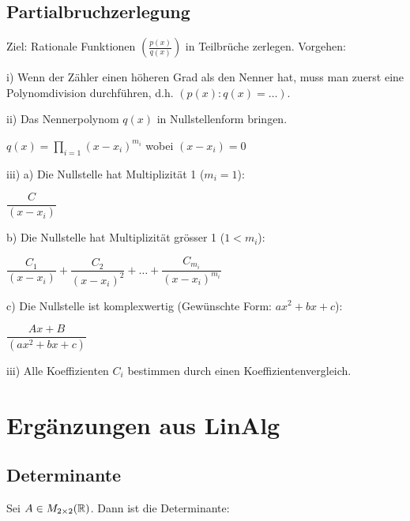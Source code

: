 \begin{multicols*}{3}
    \subsection{Partialbruchzerlegung}

    Ziel: Rationale Funktionen $\left(\frac{p(x)}{q(x)}\right)$ in Teilbrüche zerlegen. Vorgehen: \medskip

    i) Wenn der Zähler einen höheren Grad als den Nenner hat, muss man zuerst eine Polynomdivision durchführen, d.h. $\left(p(x):q(x) = \dots\right)$. \medskip

    ii) Das Nennerpolynom $q(x)$ in Nullstellenform bringen.

    \begin{center}
        $q(x) = \prod\limits_{i = 1} (x - x_i)^{m_i}$ \qquad wobei $(x - x_i) = 0$
    \end{center}

    iii) a) Die Nullstelle hat Multiplizität 1 ($m_i = 1$):

    \begin{center}
        $\dfrac{C}{(x - x_i)}$
    \end{center}

    b) Die Nullstelle hat Multiplizität grösser 1 ($1 < m_i$):

    \begin{center}
        $\dfrac{C_1}{(x - x_i)} + \dfrac{C_2}{(x - x_i)^2} + \dots + \dfrac{C_{m_i}}{(x - x_i)^{m_i}}$
    \end{center}

    c) Die Nullstelle ist komplexwertig (Gewünschte Form: $ax^2 + b x + c$):

    \begin{center}
        $\dfrac{Ax + B}{(a x^2 + b x + c)}$
    \end{center}

    iii) Alle Koeffizienten $C_i$ bestimmen durch einen Koeffizientenvergleich.
    \vfill\null
    \columnbreak


    \section{Ergänzungen aus LinAlg}

    \subsection{Determinante}

    Sei $A \in M_{2 \times 2}(\mathbb{R})$. Dann ist die Determinante:


\end{multicols*}
